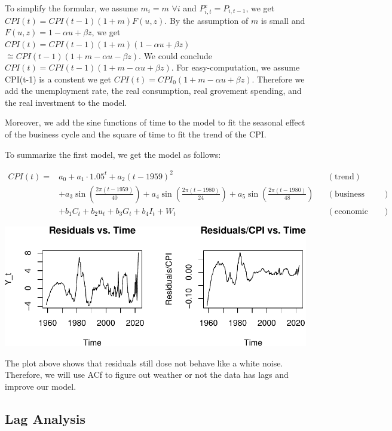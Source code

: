 \documentclass[
  man,floatsintext,
  man]{apa6}
\begin{document}
To simplify the formular, we assume \(m_i = m \,\, \forall i\) and \(P_{i,t}^e = P_{i,t-1}\), we get \(CPI(t) = CPI(t-1) (1+m) F(u,z)\).
By the assumption of \(m\) is small and \(F(u,z) = 1 - \alpha u + \beta z\), we get \(CPI(t) = CPI(t-1) (1+m) (1 - \alpha u + \beta z)\) \(\cong CPI(t-1) ( 1 + m - \alpha u - \beta z)\).
We could conclude \(CPI(t)=CPI(t-1)(1 + m - \alpha u + \beta z)\).
For easy-computation, we assume CPI(t-1) is a constent we get \(CPI(t)=CPI_0(1 + m - \alpha u + \beta z)\).
Therefore we add the unemployment rate, the real consumption, real grovement spending, and the real investment to the model.

Moreover, we add the sine functions of time to the model to fit the seasonal effect of the business cycle and the square of time to fit the trend of the CPI.

To summarize the first model, we get the model as follows:

\begin{align*}
CPI(t) =& a_0 + a_1 \cdot 1.05^t  + a_2 (t-1959)^2 && (\text{trend})\\
& + a_3 \sin\left(\frac{2\pi(t-1959)}{40}\right) + a_4 \sin\left(\frac{2\pi(t-1980)}{24}\right) + a_5 \sin\left(\frac{2\pi(t-1980)}{48}\right) && (\text{business cycle})\\
& + b_1 C_t + b_2 u_t + b_3 G_t + b_4 I_t + W_t && (\text{economic variables})
\end{align*}

\includegraphics{stat429_group2_final_proj_files/figure-latex/unnamed-chunk-3-1.pdf}

The plot above shows that residuals still dose not behave like a white noise.
Therefore, we will use ACf to figure out weather or not the data has lags and improve our model.

\hypertarget{lag-analysis}{%
\subsection{Lag Analysis}\label{lag-analysis}}
\end{document}
